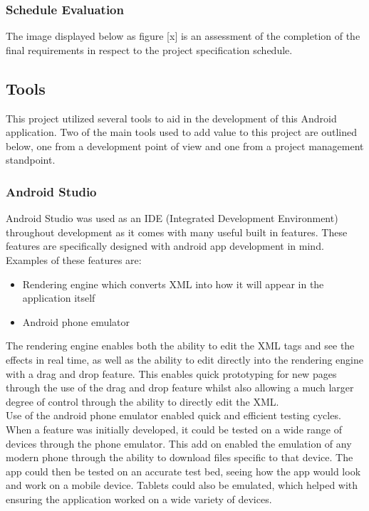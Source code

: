 \documentclass{article}
\begin{document}
\subsubsection{Schedule Evaluation}

The image displayed below as figure [x] is an assessment of the completion of the final requirements in respect to the project specification schedule. 

%
%
%

\subsection{Tools}

This project utilized several tools to aid in the development of this Android application. Two of the main tools used to add value to this project are outlined below, one from a development point of view and one from a project management standpoint. 

\subsubsection{Android Studio}

Android Studio was used as an IDE (Integrated Development Environment) throughout development as it comes with many useful built in features. These features are specifically designed with android app development in mind. Examples of these features are: 

\begin{itemize}
	\item Rendering engine which converts XML into how it will appear in the application itself
	\item Android phone emulator
\end{itemize}

The rendering engine enables both the ability to edit the XML tags and see the effects in real time, as well as the ability to edit directly into the rendering engine with a drag and drop feature. This enables quick prototyping for new pages through the use of the drag and drop feature whilst also allowing a much larger degree of control through the ability to directly edit the XML.\\

Use of the android phone emulator enabled quick and efficient testing cycles. When a feature was initially developed, it could be tested on a wide range of devices through the phone emulator. This add on enabled the emulation of any modern phone through the ability to download files specific to that device. The app could then be tested on an accurate test bed, seeing how the app would look and work on a mobile device. Tablets could also be emulated, which helped with ensuring the application worked on a wide variety of devices.\\
\end{document}
